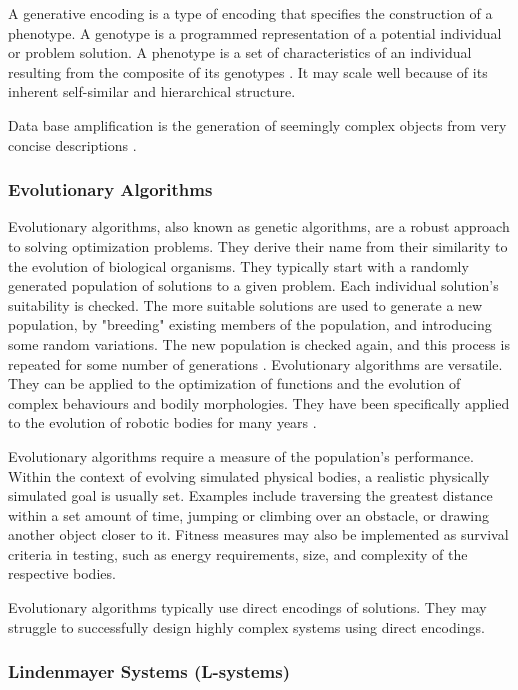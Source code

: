 A generative encoding is a type of encoding that specifies the construction of a phenotype. A genotype is a programmed representation of a potential individual or problem solution. A phenotype is a set of characteristics of an individual resulting from the composite of its genotypes \cite{Sims1994a}. It may scale well because of its inherent self-similar and hierarchical structure. \cite{Hornby2001b}

Data base amplification is the generation of seemingly complex objects from very concise descriptions \cite{Prusinkiewicz2004}.

\subsubsection{Evolutionary Algorithms}

Evolutionary algorithms, also known as genetic algorithms, are a robust approach to solving optimization problems. They derive their name from their similarity to the evolution of biological organisms. They typically start with a randomly generated population of solutions to a given problem. Each individual solution's suitability is checked. The more suitable solutions are used to generate a new population, by "breeding" existing members of the population, and introducing some random variations. The new population is checked again, and this process is repeated for some number of generations \cite{Groenwold1999}. Evolutionary algorithms are versatile. They can be applied to the optimization of functions and the evolution of complex behaviours and bodily morphologies. They have been specifically applied to the evolution of robotic bodies for many years \cite{Sims1994a,Sims1994b}.

Evolutionary algorithms require a measure of the population's performance. Within the context of evolving simulated physical bodies, a realistic physically simulated goal is usually set. Examples include traversing the greatest distance within a set amount of time, jumping or climbing over an obstacle, or drawing another object closer to it. Fitness measures may also be implemented as survival criteria in testing, such as energy requirements, size, and complexity of the respective bodies. \cite{Sims1994a, Sims1994b}

Evolutionary algorithms typically use direct encodings of solutions. They may struggle to successfully design highly complex systems using direct encodings. \cite{Hornby2001b}

\subsubsection{Lindenmayer Systems (L-systems)}

